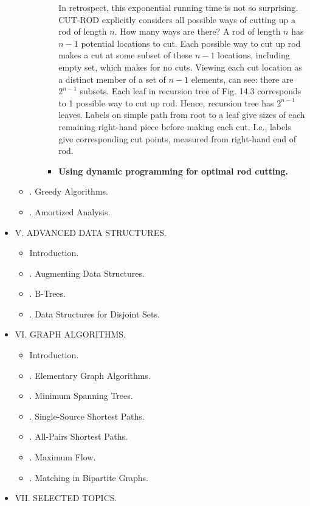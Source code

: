 \documentclass{article}
\begin{document}
\begin{itemize}
\begin{itemize}
\begin{itemize}
\begin{itemize}
				In retrospect, this exponential running time is not so surprising. CUT-ROD explicitly considers all possible ways of cutting up a rod of length $n$. How many ways are there? A rod of length $n$ has $n - 1$ potential locations to cut. Each possible way to cut up rod makes a cut at some subset of these $n - 1$ locations, including empty set, which makes for no cuts. Viewing each cut location as a distinct member of a set of $n - 1$ elements, can see: there are $2^{n-1}$ subsets. Each leaf in recursion tree of {\sf Fig. 14.3} corresponds to 1 possible way to cut up rod. Hence, recursion tree has $2^{n-1}$ leaves. Labels on simple path from root to a leaf give sizes of each remaining right-hand piece before making each cut. I.e., labels give corresponding cut points, measured from right-hand end of rod.
				\item {\bf Using dynamic programming for optimal rod cutting.}
			\end{itemize}
		\end{itemize}
		\item {. Greedy Algorithms.}
		\item {. Amortized Analysis.}
	\end{itemize}
	\item {\sf V. ADVANCED DATA STRUCTURES.}
	\begin{itemize}
		\item {\sf Introduction.}
		\item {. Augmenting Data Structures.}
		\item {. B-Trees.}
		\item {. Data Structures for Disjoint Sets.}
	\end{itemize}
	\item {\sf VI. GRAPH ALGORITHMS.}
	\begin{itemize}
		\item {\sf Introduction.}
		\item {. Elementary Graph Algorithms.}
		\item {. Minimum Spanning Trees.}
		\item {. Single-Source Shortest Paths.}
		\item {. All-Pairs Shortest Paths.}
		\item {. Maximum Flow.}
		\item {. Matching in Bipartite Graphs.}
	\end{itemize}
	\item {\sf VII. SELECTED TOPICS.}
	\begin{itemize}

\end{itemize}
\end{itemize}
\end{document}
